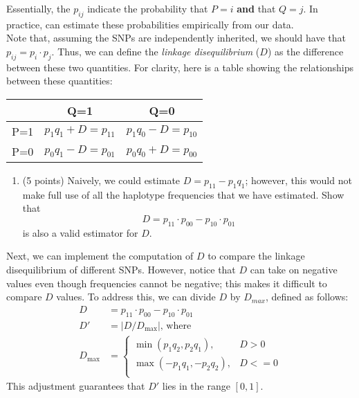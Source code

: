     Essentially, the $p_{ij}$ indicate the probability that $P = i$ \textbf{and} that $Q=j$. In practice,  can estimate these probabilities empirically from our data. \\
    
    Note that, assuming the SNPs are independently inherited, we should have that $p_{ij} = p_{i} \cdot p_{j}$. Thus, we can define the \textit{linkage disequilibrium} ($D$) as the difference between these two quantities. For clarity, here is a table showing the relationships between these quantities:
    \begin{center}
        \begin{tabular}{|c|c|c|}
        \hline
             & Q=1& Q=0\\
        \hline
             P=1& $p_{1}q_{1} + D = p_{11}$& $p_{1}q_{0} - D = p_{10}$\\
        \hline
             P=0& $p_{0}q_{1} - D = p_{01}$& $p_{0}q_{0} + D = p_{00}$ \\
        \hline
        \end{tabular}        
    \end{center}

\begin{enumerate}[resume]
    \item (5 points) Naively, we could estimate $D = p_{11} - p_{1}q_{1}$; however, this would not make full use of all the haplotype frequencies that we have estimated. Show that $$D=p_{11} \cdot p_{00} - p_{10} \cdot p_{01}$$
    is also a valid estimator for $D$.
    \begin{solution}
    \end{solution}
\end{enumerate}
Next, we can implement the computation of $D$ to compare the linkage disequilibrium of different SNPs. However, notice that $D$ can take on negative values even though frequencies cannot be negative; this makes it difficult to compare $D$ values. To address this, we can divide $D$ by $D_{max}$, defined as follows:
    \begin{align*}
        D &= p_{11} \cdot p_{00} - p_{10} \cdot p_{01} \\
        D' &= | D / D_{\text{max}} | \text{, where} \\
        D_{\text{max}} &= \begin{cases}
        \min(p_1q_2, p_2q_1), & D > 0 \\
        \max(-p_1q_1, -p_2q_2), & D <= 0 \\
        \end{cases}
    \end{align*}
    This adjustment guarantees that $D'$ lies in the range $[0, 1]$.
    

